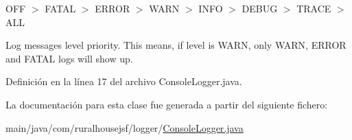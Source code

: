 {\ttfamily O\+FF $>$ F\+A\+T\+AL $>$ E\+R\+R\+OR $>$ W\+A\+RN $>$ I\+N\+FO $>$ D\+E\+B\+UG $>$ T\+R\+A\+CE $>$ A\+LL} 

Log messages level priority. This means, if level is {\ttfamily W\+A\+RN}, only {\ttfamily W\+A\+RN}, {\ttfamily E\+R\+R\+OR} and {\ttfamily F\+A\+T\+AL} logs will show up. 

Definición en la línea 17 del archivo Console\+Logger.\+java.



La documentación para esta clase fue generada a partir del siguiente fichero\+:\begin{DoxyCompactItemize}
\item 
main/java/com/ruralhousejsf/logger/\mbox{\hyperlink{_console_logger_8java}{Console\+Logger.\+java}}\end{DoxyCompactItemize}
